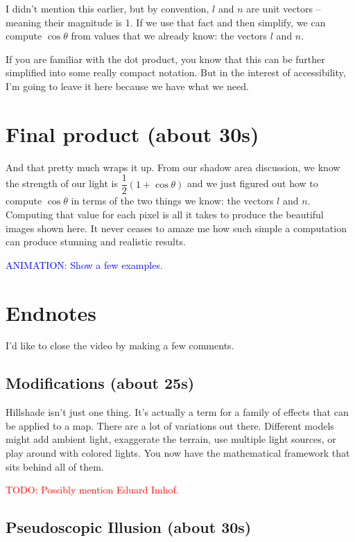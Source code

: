 \documentclass{article}
\newcommand\todo[1]{\textcolor{red}{TODO: #1}}
\newcommand\animation[1]{\textcolor{blue}{ANIMATION: #1}}
\begin{document}
I didn't mention this earlier, but by convention, $l$ and $n$ are unit vectors -- meaning their magnitude is 1.
If we use that fact and then simplify, we can compute $\cos \theta$ from values that we already know: the vectors $l$ and $n$.

If you are familiar with the dot product, you know that this can be further simplified into some really compact notation.
But in the interest of accessibility, I'm going to leave it here because we have what we need.

\section{Final product (about 30s)}

And that pretty much wraps it up.
From our shadow area discussion, we know the strength of our light is $\dfrac{1}{2}(1 + \cos \theta)$ and we just figured out how to compute $\cos \theta$ in terms of the two things we know: the vectors $l$ and $n$.
Computing that value for each pixel is all it takes to produce the beautiful images shown here.
It never ceases to amaze me how such simple a computation can produce stunning and realistic results.

\animation{Show a few examples.}

\section{Endnotes}

I'd like to close the video by making a few comments.

\subsection{Modifications (about 25s)}

Hillshade isn't just one thing.
It's actually a term for a family of effects that can be applied to a map.
There are a lot of variations out there.
Different models might add ambient light, exaggerate the terrain, use multiple light sources, or play around with colored lights.
You now have the mathematical framework that sits behind all of them.

\todo{Possibly mention Eduard Imhof.}

\subsection{Pseudoscopic Illusion (about 30s)}
\end{document}
